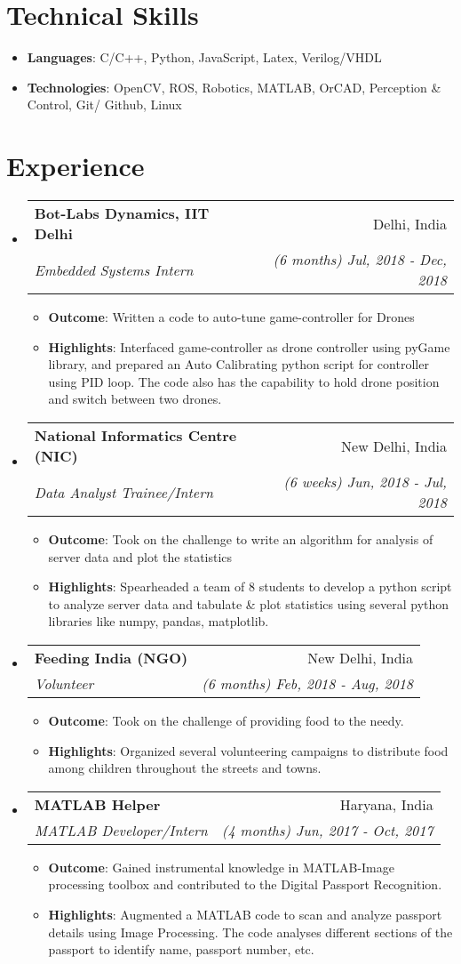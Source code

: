 \documentclass[letterpaper,11pt]{article}
\makeatletter
\newcommand{\resumeItem}[2]{
  \item\small{
    \textbf{#1}{: #2 \vspace{-2pt}}
  }
}
\newcommand{\resumeSubheading}[4]{
  \vspace{-1pt}\item
    \begin{tabular*}{0.97\textwidth}{l@{\extracolsep{\fill}}r}
      \textbf{#1} & #2 \\
      \textit{\small#3} & \textit{\small #4} \\
    \end{tabular*}\vspace{-5pt}
}
\newcommand{\resumeSubHeadingListStart}{\begin{itemize}[leftmargin=*]}
\newcommand{\resumeSubHeadingListEnd}{\end{itemize}}
\newcommand{\resumeItemListStart}{\begin{itemize}}
\newcommand{\resumeItemListEnd}{\end{itemize}\vspace{-5pt}}
\makeatother
\begin{document}
\section{Technical Skills}
  \resumeSubHeadingListStart
    \item{\textbf{Languages}{: C/C++, Python, JavaScript, Latex, Verilog/VHDL}}
      \hfill
      \item{\textbf{Technologies}{: OpenCV, ROS, Robotics, MATLAB, OrCAD, Perception \& Control, Git/ Github, Linux}}
  \resumeSubHeadingListEnd

\section{Experience}
  \resumeSubHeadingListStart
    \resumeSubheading
      {Bot-Labs Dynamics, IIT Delhi}{Delhi, India}
      {Embedded Systems Intern}{(6 months) Jul, 2018 - Dec, 2018}
      \resumeItemListStart
        \resumeItem{Outcome}
          {Written a code to auto-tune game-controller for Drones}
        \resumeItem{Highlights}
          {Interfaced game-controller as drone controller using pyGame library, and prepared an Auto Calibrating python script for controller using PID loop. The code also has the capability to hold drone position and switch between two drones.}
      \resumeItemListEnd

    \resumeSubheading
      {National Informatics Centre (NIC)}{New Delhi, India}
      {Data Analyst Trainee/Intern}{(6 weeks) Jun, 2018 - Jul, 2018}
      \resumeItemListStart
        \resumeItem{Outcome}
          {Took on the challenge to write an algorithm for analysis of server data and plot the statistics }
        \resumeItem{Highlights}
          {Spearheaded a team of 8 students to develop a python script to analyze server data and tabulate \& plot statistics using several python libraries like numpy, pandas, matplotlib.}
      \resumeItemListEnd

    \resumeSubheading
      {Feeding India (NGO)}{New Delhi, India}
      {Volunteer}{(6 months) Feb, 2018 - Aug, 2018}
      \resumeItemListStart
        \resumeItem{Outcome}
          {Took on the challenge of providing food to the needy.}
        \resumeItem{Highlights}
          {Organized several volunteering campaigns to distribute food among children throughout the streets and towns.}
      \resumeItemListEnd
      
    \resumeSubheading
      {MATLAB Helper}{Haryana, India}
      {MATLAB Developer/Intern}{(4 months) Jun, 2017 - Oct, 2017}
      \resumeItemListStart
        \resumeItem{Outcome}
          {Gained instrumental knowledge in MATLAB-Image processing toolbox and contributed to the Digital Passport Recognition.}
        \resumeItem{Highlights}
          {Augmented a MATLAB code to scan and analyze passport details using Image Processing. The code analyses different sections of the passport to identify name, passport number, etc.}
      \resumeItemListEnd
  \resumeSubHeadingListEnd
\end{document}
